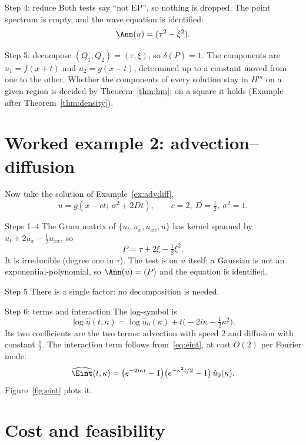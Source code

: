 \begin{example}{Step 4: reduce}
Both tests say ``not EP'', so nothing is dropped. The point spectrum is empty, and the wave equation is identified:
\[
\Ann(u)=(\tau^2-\xi^2).
\]
\end{example}

\begin{example}{Step 5: decompose}
$(Q_1,Q_2)=(\tau,\xi)$, so $\delta(P)=1$. The components are $u_1=f(x+t)$ and $u_2=g(x-t)$, determined up to a constant moved from one to the other. Whether the components of every solution stay in $H^m$ on a given region is decided by Theorem~\ref{thm:hm}; on a square it holds (Example after Theorem~\ref{thm:density}).
\end{example}

\section{Worked example 2: advection--diffusion}

Now take the solution of Example~\ref{ex:advdiff},
\[
u=g(x-ct;\ \sigma^2+2Dt),\qquad c=2,\ D=\tfrac12,\ \sigma^2=1 .
\]

\begin{example}{Steps 1--4}
The Gram matrix of $\{u_t,u_x,u_{xx},u\}$ has kernel spanned by $u_t+2u_x-\tfrac12u_{xx}$, so
\[
P=\tau+2\xi-\tfrac12\xi^2 .
\]
It is irreducible (degree one in $\tau$). The test is on $u$ itself: a Gaussian is not an exponential-polynomial, so $\Ann(u)=(P)$ and the equation is identified.
\end{example}

\begin{example}{Step 5}
There is a single factor: no decomposition is needed.
\end{example}

\begin{example}{Step 6: terms and interaction}
The log-symbol is
\[
\log\hat u(t,\kappa)=\log\hat u_0(\kappa)+t\big(-2i\kappa-\tfrac12\kappa^2\big).
\]
Its two coefficients are the two terms: advection with speed $2$ and diffusion with constant $\tfrac12$. The interaction term follows from~\eqref{eq:eint}, at cost $O(2)$ per Fourier mode:
\[
\widehat{\Eint}(t,\kappa)=\big(e^{-2i\kappa t}-1\big)\big(e^{-\kappa^2t/2}-1\big)\,\hat u_0(\kappa).
\]
Figure~\ref{fig:eint} plots it.
\end{example}

\section{Cost and feasibility}

